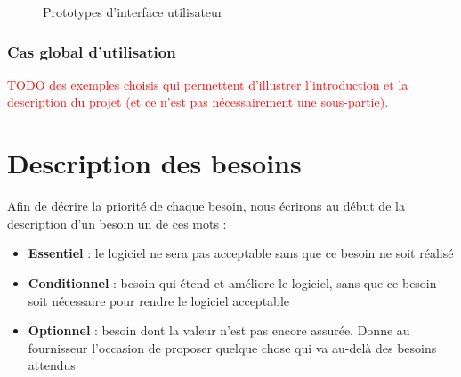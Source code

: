 \documentclass{article}
\newcommand\todo[1]{\textcolor{red}{#1}}
\begin{document}
		\begin{figure}[hb!]
			\centering
			\label{test}
			\caption{Prototypes d'interface utilisateur}
			\label{fig:gui}
		\end{figure}
        \subsubsection{Cas global d'utilisation}\label{interface_utilisateur}
    	\todo{TODO des exemples choisis qui permettent
                d'illustrer l'introduction et la description du projet (et ce n'est pas
                nécessairement une sous-partie).
                }
                \newpage		
		\section{Description des besoins} \label{besoins}
		Afin de décrire la priorité de chaque besoin, nous écrirons au début de la description d'un besoin un de ces mots :
		\begin{itemize}
			\item \textbf{Essentiel} : le logiciel ne sera pas acceptable sans que ce besoin ne soit réalisé
			\item \textbf{Conditionnel} : besoin qui étend et améliore le logiciel, sans que ce besoin soit nécessaire pour rendre le logiciel acceptable
			\item \textbf{Optionnel} : besoin dont la valeur n’est pas encore assurée. Donne au fournisseur l’occasion de proposer quelque chose qui va au-delà des besoins attendus
		\end{itemize}
\end{document}
